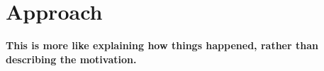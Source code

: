  \section{Approach}

%
%

\textbf{This is more like explaining how things happened, rather than describing the motivation.}

